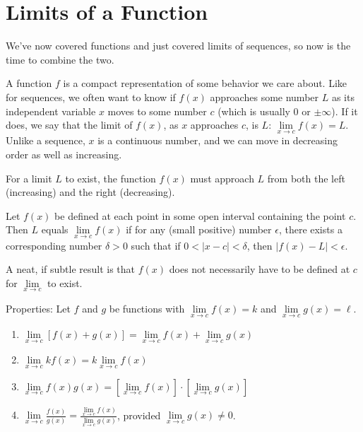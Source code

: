 \documentclass[]{book}
\providecommand{\tightlist}{%
  \setlength{\itemsep}{0pt}\setlength{\parskip}{0pt}}
\theoremstyle{definition}
\theoremstyle{definition}
\theoremstyle{definition}
\theoremstyle{remark}
\let\BeginKnitrBlock\begin \let\EndKnitrBlock\end
\begin{document}
\hypertarget{limitsfun}{%
\section{Limits of a Function}\label{limitsfun}}

We've now covered functions and just covered limits of sequences, so now is the time to combine the two.

A function \(f\) is a compact representation of some behavior we care about. Like for sequences, we often want to know if \(f(x)\) approaches some number \(L\) as its independent variable \(x\) moves to some number \(c\) (which is usually 0 or \(\pm\infty\)). If it does, we say that the limit of \(f(x)\), as \(x\) approaches \(c\), is \(L\): \(\lim\limits_{x \to c} f(x)=L\). Unlike a sequence, \(x\) is a continuous number, and we can move in decreasing order as well as increasing.

For a limit \(L\) to exist, the function \(f(x)\) must approach \(L\) from both the left (increasing) and the right (decreasing).

\BeginKnitrBlock{definition}[Limit of a function]
\protect\hypertarget{def:unnamed-chunk-5}{}{\label{def:unnamed-chunk-5} {} }Let \(f(x)\) be defined at each point in some open interval containing the point \(c\). Then \(L\) equals \(\lim\limits_{x \to c} f(x)\) if for any (small positive) number \(\epsilon\), there exists a corresponding number \(\delta>0\) such that if \(0<|x-c|<\delta\), then \(|f(x)-L|<\epsilon\).
\EndKnitrBlock{definition}

A neat, if subtle result is that \(f(x)\) does not necessarily have to be defined at \(c\) for \(\lim\limits_{x \to c}\) to exist.

Properties: Let \(f\) and \(g\) be functions with \(\lim\limits_{x \to c} f(x)=k\) and \(\lim\limits_{x \to c} g(x)=\ell\).

\begin{enumerate}
\def\labelenumi{\arabic{enumi}.}
\tightlist
\item
  \(\lim\limits_{x \to c}[f(x)+g(x)]=\lim\limits_{x \to c} f(x)+ \lim\limits_{x \to c} g(x)\)
\item
  \(\lim\limits_{x \to c} kf(x) = k\lim\limits_{x \to c} f(x)\)
\item
  \(\lim\limits_{x \to c} f(x) g(x) = \left[\lim\limits_{x \to c} f(x)\right]\cdot \left[\lim\limits_{x \to c} g(x)\right]\)
\item
  \(\lim\limits_{x \to c} \frac{f(x)}{g(x)} = \frac{\lim\limits_{x \to c} f(x)}{\lim\limits_{x \to c} g(x)}\), provided \(\lim\limits_{x \to c} g(x)\ne 0\).
\end{enumerate}
\end{document}
